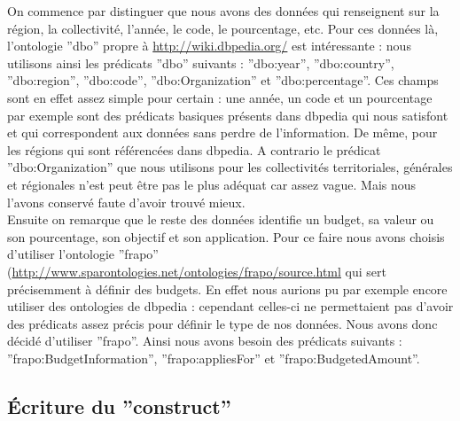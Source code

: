 \documentclass[a4paper,sffamily,12pt]{article}
\begin{document}
			\indent On commence par distinguer que nous avons des données qui renseignent sur la région, la collectivité, l'année, le code, le pourcentage, etc. Pour ces données là, l'ontologie ''dbo'' propre à \url{http://wiki.dbpedia.org/} est intéressante : nous utilisons ainsi les prédicats ''dbo'' suivants : ''dbo:year'', ''dbo:country'', ''dbo:region'', ''dbo:code'', ''dbo:Organization'' et ''dbo:percentage''. Ces champs sont en effet assez simple pour certain : une année, un code et un pourcentage par exemple sont des prédicats basiques présents dans dbpedia qui nous satisfont et qui correspondent aux données sans perdre de l'information. De même, pour les régions qui sont référencées dans dbpedia. A contrario le prédicat ''dbo:Organization'' que nous utilisons pour les collectivités territoriales, générales et régionales n'est peut être pas le plus adéquat car assez vague. Mais nous l'avons conservé faute d'avoir trouvé mieux.  \\ 
		
			\indent Ensuite on remarque que le reste des données identifie un budget, sa valeur ou son pourcentage, son objectif et son application. Pour ce faire nous avons choisis d'utiliser l'ontologie ''frapo'' (\url{http://www.sparontologies.net/ontologies/frapo/source.html} qui sert précisemment à définir des budgets. En effet nous aurions pu par exemple encore utiliser des ontologies de dbpedia : cependant celles-ci ne permettaient pas d'avoir des prédicats assez précis pour définir le type de nos données.  Nous avons donc décidé d'utiliser ''frapo''. Ainsi nous avons besoin des prédicats suivants : ''frapo:BudgetInformation'', ''frapo:appliesFor'' et ''frapo:BudgetedAmount''.
		
			\vspace{0.5cm}
			
		\subsection{Écriture du ''construct''}
			
			\vspace{0.5cm}
		
\end{document}
